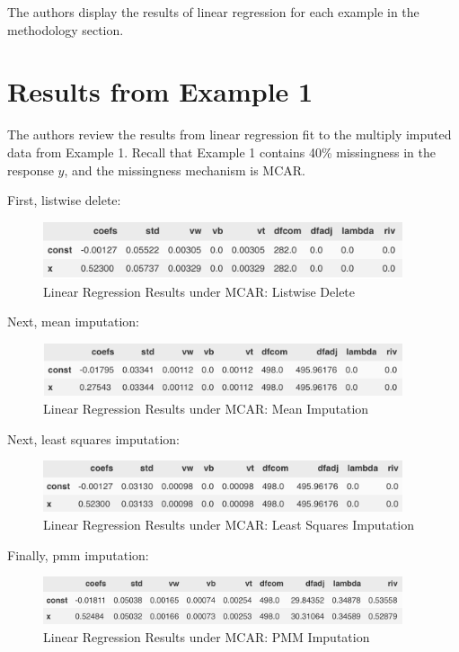 \documentclass[12pt,oneside]{chicagocapstone}
\begin{document}
The authors display the results of linear regression for each example in
the methodology section.

\section*{Results from Example 1}\label{results-from-example-1}

The authors review the results from linear regression fit to the
multiply imputed data from Example 1. Recall that Example 1 contains
40\% missingness in the response \(y\), and the missingness mechanism is
MCAR.

First, listwise delete:
\begin{figure}

{\centering \includegraphics[width=400px]{figure/mcar-listwise-delete} 

}

\caption{Linear Regression Results under MCAR: Listwise Delete}\label{fig:mcar-listwise-delete}
\end{figure}
Next, mean imputation:
\begin{figure}

{\centering \includegraphics[width=400px]{figure/mcar-mean} 

}

\caption{Linear Regression Results under MCAR: Mean Imputation}\label{fig:mcar-mean}
\end{figure}
Next, least squares imputation:
\begin{figure}

{\centering \includegraphics[width=400px]{figure/mcar-ls} 

}

\caption{Linear Regression Results under MCAR: Least Squares Imputation}\label{fig:mcar-ls}
\end{figure}
Finally, pmm imputation:
\begin{figure}

{\centering \includegraphics[width=400px]{figure/mcar-pmm} 

}

\caption{Linear Regression Results under MCAR: PMM Imputation}\label{fig:mcar-pmm}
\end{figure}
\end{document}
